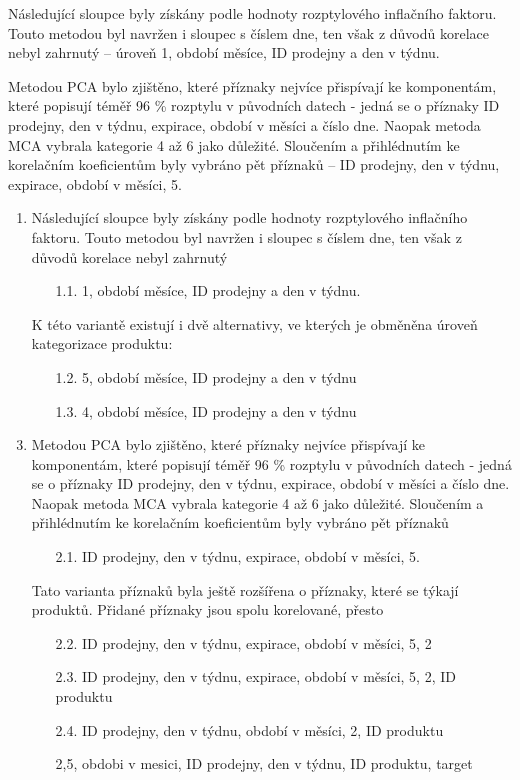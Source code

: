 Následující sloupce byly získány podle hodnoty rozptylového inflačního faktoru. Touto metodou byl navržen i sloupec s číslem dne, ten však z důvodů korelace nebyl zahrnutý -- úroveň 1, období měsíce, ID prodejny a den v týdnu.
    
Metodou PCA bylo zjištěno, které příznaky nejvíce přispívají ke komponentám, které popisují téměř 96 \% rozptylu v původních datech - jedná se o příznaky ID prodejny, den v týdnu, expirace, období v měsíci a číslo dne. 
Naopak metoda MCA vybrala kategorie 4 až 6 jako důležité. Sloučením a přihlédnutím ke korelačním koeficientům byly vybráno pět příznaků -- 
    ID prodejny, den v týdnu, expirace, období v měsíci, 5.

\begin{enumerate}
    \item Následující sloupce byly získány podle hodnoty rozptylového inflačního faktoru. Touto metodou byl navržen i sloupec s číslem dne, ten však z důvodů korelace nebyl zahrnutý
    \begin{enumerate}
        \item[1.1.] 1, období měsíce, ID prodejny a den v týdnu.
    \end{enumerate}
    
    \item[] K této variantě existují i dvě alternativy, ve kterých je obměněna úroveň kategorizace produktu:     
    \begin{enumerate}
    \item[1.2.] 5, období měsíce, ID prodejny a den v týdnu
    \item[1.3.] 4, období měsíce, ID prodejny a den v týdnu
    \end{enumerate}
    \item Metodou PCA bylo zjištěno, které příznaky nejvíce přispívají ke komponentám, které popisují téměř 96 \% rozptylu v původních datech - jedná se o příznaky ID prodejny, den v týdnu, expirace, období v měsíci a číslo dne. Naopak metoda MCA vybrala kategorie 4 až 6 jako důležité. Sloučením a přihlédnutím ke korelačním koeficientům byly vybráno pět příznaků
    \begin{enumerate}
        \item[2.1.] ID prodejny, den v týdnu, expirace, období v měsíci, 5.
    \end{enumerate}
    \item[] Tato varianta příznaků byla ještě rozšířena o příznaky, které se týkají produktů. Přidané příznaky jsou spolu korelované, přesto 
    \begin{enumerate}
    \item[2.2.] ID prodejny, den v týdnu, expirace, období v měsíci, 5, 2
    \item[2.3.] ID prodejny, den v týdnu, expirace, období v měsíci, 5, 2, ID produktu
    \item[2.4.] ID prodejny, den v týdnu, období v měsíci, 2, ID produktu
    \item[] 2,5, obdobi v mesici,  ID prodejny, den v týdnu, ID produktu, target
    \end{enumerate}
\end{enumerate}

